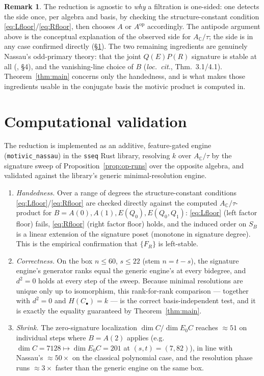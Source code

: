 \documentclass[11pt]{article}
\theoremstyle{definition}
\newtheorem{remark}[theorem]{Remark}
\DeclareMathOperator{\op}{op}
\newcommand{\Actau}{A_{\mathbb C}/\tau}
\newcommand{\Aop}{A^{\op}}
\begin{document}
\begin{remark}
The reduction is agnostic to \emph{why} a filtration is one-sided: one detects the
side once, per algebra and basis, by checking the structure-constant condition
\eqref{eq:Lfloor}/\eqref{eq:Rfloor}, then chooses $A$ or $\Aop$ accordingly. The
antipode argument above is the conceptual explanation of the observed side for
$\Actau$; the side is in any case confirmed directly (\S\ref{sec:computation}). The
two remaining ingredients are genuinely Nassau's odd-primary theory: that the joint
$Q(E)P(R)$ signature is stable at all (\cite{nassau}, \S4), and the vanishing-line
choice of $B$ (\emph{loc.\ cit.}, Thm.~3.1/4.1). Theorem~\ref{thm:main} concerns
only the handedness, and is what makes those ingredients usable in the conjugate
basis the motivic product is computed in.
\end{remark}

\section{Computational validation}\label{sec:computation}

The reduction is implemented as an additive, feature-gated engine
(\texttt{motivic\_nassau}) in the \texttt{sseq} Rust library, resolving $k$ over
$\Actau$ by the signature sweep of Proposition~\ref{prop:op-runs} over the opposite
algebra, and validated against the library's generic minimal-resolution engine.

\begin{enumerate}[leftmargin=*]
\item \emph{Handedness.} Over a range of degrees the structure-constant conditions
\eqref{eq:Lfloor}/\eqref{eq:Rfloor} are checked directly against the computed
$\Actau$-product for $B=A(0),A(1),E(Q_0),E(Q_0,Q_1)$: \eqref{eq:Lfloor} (left factor
floor) fails, \eqref{eq:Rfloor} (right factor floor) holds, and the induced order
on $S_B$ is a linear extension of the signature poset (monotone in signature
degree). This is the empirical confirmation that $\{F_R\}$ is left-stable.

\item \emph{Correctness.} On the box $n\le 60$, $s\le 22$ (stem $n=t-s$), the
signature engine's generator ranks equal the generic engine's at every bidegree,
and $d^2=0$ holds at every step of the sweep. Because minimal resolutions are unique
only up to isomorphism, this rank-for-rank comparison --- together with $d^2=0$ and
$H(C_\bullet)=k$ --- is the correct basis-independent test, and it is exactly the
equality guaranteed by Theorem~\ref{thm:main}.

\item \emph{Shrink.} The zero-signature localization $\dim C/\dim E_0C$ reaches
$\approx 51$ on individual steps where $B=A(2)$ applies (e.g.\ $\dim C=7128\mapsto
\dim E_0C=201$ at $(s,t)=(7,82)$), in line with Nassau's $\approx 50\times$ on the
classical polynomial case, and the resolution phase runs $\approx 3\times$ faster
than the generic engine on the same box.
\end{enumerate}
\end{document}
